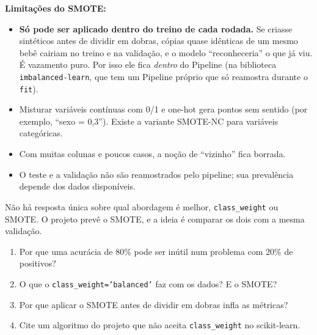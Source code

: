 \documentclass[11pt,a4paper]{article}
\newcommand{\cod}[1]{\texttt{#1}}
\begin{document}
\begin{center}
\end{center}

\textbf{Limitações do SMOTE:}
\begin{itemize}
  \item \textbf{Só pode ser aplicado dentro do treino de cada rodada.} Se criasse sintéticos antes de dividir em dobras, cópias quase idênticas de um mesmo bebê cairiam no treino e na validação, e o modelo ``reconheceria'' o que já viu. É vazamento puro. Por isso ele fica \emph{dentro} do Pipeline (na biblioteca \cod{imbalanced-learn}, que tem um Pipeline próprio que só reamostra durante o \cod{fit}).
  \item Misturar variáveis contínuas com 0/1 e one-hot gera pontos sem sentido (por exemplo, ``sexo = 0,3''). Existe a variante SMOTE-NC para variáveis categóricas.
  \item Com muitas colunas e poucos casos, a noção de ``vizinho'' fica borrada.
  \item O teste e a validação não são reamostrados pelo pipeline; sua prevalência depende dos dados disponíveis.
\end{itemize}

\begin{atencao}
Não há resposta única sobre qual abordagem é melhor, \cod{class\_weight} ou SMOTE. O projeto prevê o SMOTE, e a ideia é comparar os dois com a mesma validação.
\end{atencao}

\begin{teste}
\begin{enumerate}
  \item Por que uma acurácia de 80\% pode ser inútil num problema com 20\% de positivos?
  \item O que o \cod{class\_weight='balanced'} faz com os dados? E o SMOTE?
  \item Por que aplicar o SMOTE antes de dividir em dobras infla as métricas?
  \item Cite um algoritmo do projeto que não aceita \cod{class\_weight} no scikit-learn.
\end{enumerate}
\end{teste}
\end{document}
